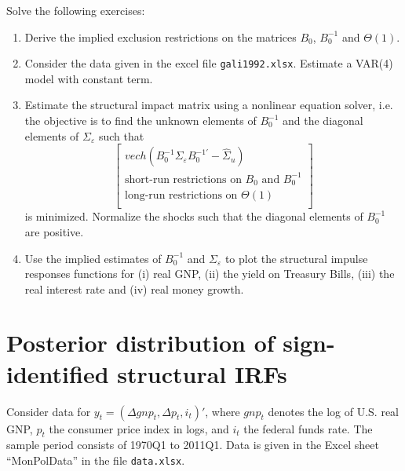 \documentclass{article}
\begin{document}
Solve the following exercises:
\begin{enumerate}
	\item Derive the implied exclusion restrictions on the matrices $B_0$, $B_0^{-1}$ and $\Theta(1)$.
	\item Consider the data given in the excel file \texttt{gali1992.xlsx}. Estimate a VAR{(4)} model with constant term.
	\item Estimate the structural impact matrix using a nonlinear equation solver, i.e. the objective is to find the unknown elements of $B_0^{-1}$ and the diagonal elements of $\Sigma_\varepsilon$ such that
	$$\begin{bmatrix}
	vech(B_0^{-1} \Sigma_\varepsilon B_0^{-1'}-\hat{\Sigma}_u)\\
	\text{short-run restrictions on }B_0 \text{ and } B_0^{-1} \\
	\text{long-run restrictions on }\Theta(1)\\
	\end{bmatrix}$$
	is minimized. Normalize the shocks such that the diagonal elements of $B_0^{-1}$ are positive.
	\item Use the implied estimates of $B_0^{-1}$ and $\Sigma_\varepsilon$ to plot the structural impulse responses functions for (i) real GNP, (ii) the yield on Treasury Bills, (iii) the real interest rate and (iv) real money growth.
\end{enumerate}

\newpage

\section{Posterior distribution of sign-identified structural IRFs}
Consider data for $y_t = (\Delta gnp_t,\Delta p_t,i_t)'$, where $gnp_t$ denotes the log of U.S. real GNP, $p_t$ the consumer price index in logs, and $i_t$ the federal funds rate. The sample period consists of 1970Q1 to 2011Q1.  Data is given in the Excel sheet \enquote{MonPolData} in the file \texttt{data.xlsx}.
\end{document}
